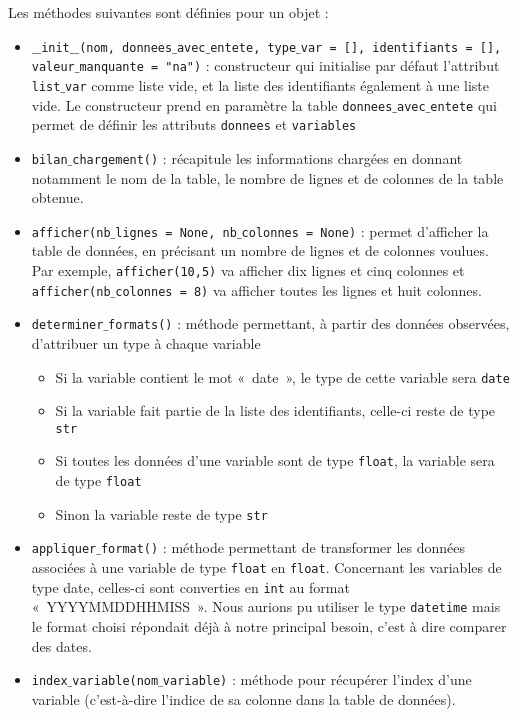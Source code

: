 \documentclass[11pt]{article}
\begin{document}
\vspace{0.5cm}
Les méthodes suivantes sont définies pour un objet : 
\begin{itemize}
    \item \texttt{$\_\_$init$\_\_$(nom, donnees$\_$avec$\_$entete, type$\_$var = [], identifiants = [], \\ valeur$\_$manquante = "na")} : constructeur qui initialise par défaut l'attribut \texttt{list$\_$var} comme liste vide, et la liste des identifiants également à une liste vide. %
    Le constructeur prend en paramètre la table \texttt{donnees$\_$avec$\_$entete} qui permet de définir les attributs  \texttt{donnees} et  \texttt{variables}
    \item \texttt{bilan$\_$chargement()} : récapitule les informations chargées en donnant notamment le nom de la table, le nombre de lignes et de colonnes de la table obtenue.
    \item \texttt{afficher(nb$\_$lignes = None, nb$\_$colonnes = None)} : permet d'afficher la table de données, en précisant un nombre de lignes et de colonnes voulues. Par exemple, \texttt{afficher(10,5)} va afficher dix lignes et cinq colonnes et \texttt{afficher(nb$\_$colonnes = 8)} va afficher toutes les lignes et huit colonnes.
    \item \texttt{determiner$\_$formats()} : méthode permettant, à partir des données observées, d'attribuer un type à chaque variable
        \begin{itemize}[label=, font= \small]
            \item Si la variable contient le mot «~date~», le type de cette variable sera \texttt{date}
            \item Si la variable fait partie de la liste des identifiants, celle-ci reste de type \texttt{str}
            \item Si toutes les données d'une variable sont de type \texttt{float}, la variable sera de type \texttt{float}
            \item Sinon la variable reste de type \texttt{str}
        \end{itemize}
    \item \texttt{appliquer$\_$format()} : méthode permettant de transformer les données associées à une variable de type \texttt{float} en \texttt{float}. Concernant les variables de type date, celles-ci sont converties en \texttt{int} au format «~YYYYMMDDHHMISS~». Nous aurions pu utiliser le type \texttt{datetime} mais le format choisi répondait déjà à notre principal besoin, c'est à dire comparer des dates. 
    \item  \texttt{index$\_$variable(nom$\_$variable)} : méthode pour récupérer l'index d'une variable (c'est-à-dire l'indice de sa colonne dans la table de données). 
\end{itemize}
\end{document}
